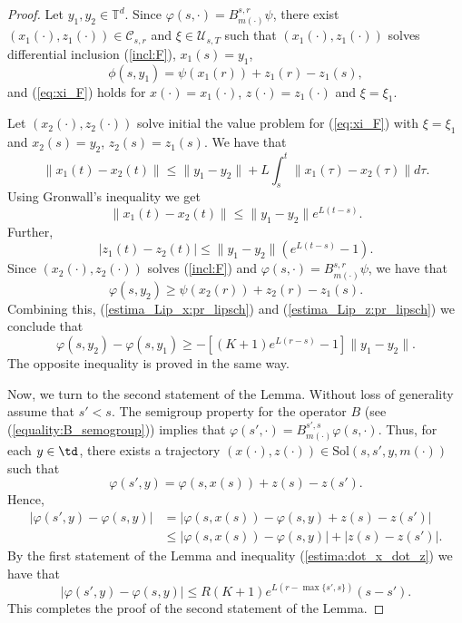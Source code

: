 \documentclass[a4paper,12pt]{article}
\begin{document}
\begin{proof}
	Let $y_1,y_2\in\mathbb{T}^d$. Since $\varphi(s,\cdot)=B^{s,r}_{m(\cdot)}\psi$, there exist $(x_1(\cdot),z_1(\cdot))\in\mathcal{C}_{s,r}$ and $\xi\in\mathcal{U}_{s,T}$ such that $(x_1(\cdot),z_1(\cdot))$ solves differential inclusion (\ref{incl:F}),   $x_1(s)=y_1$,
	$$\phi(s,y_1)=\psi(x_1(r))+z_1(r)-z_1(s), $$ and (\ref{eq:xi_F}) holds  for $x(\cdot)=x_1(\cdot)$, $z(\cdot)=z_1(\cdot)$ and $\xi=\xi_1$.
	
	Let $(x_2(\cdot),z_2(\cdot))$ solve initial the value problem for (\ref{eq:xi_F}) with $\xi=\xi_1$ and $x_2(s)=y_2$, $z_2(s)=z_1(s)$. We have that
	$$\|x_1(t)-x_2(t)\|\leq \|y_1-y_2\|+ L\int_s^t\|x_1(\tau)-x_2(\tau)\|d\tau. $$ Using Gronwall's inequality we get
	\begin{equation}\label{estima_Lip_x:pr_lipsch}
	\|x_1(t)-x_2(t)\|\leq \|y_1-y_2\|e^{L(t-s)}.
	\end{equation}
	Further,
	\begin{equation}\label{estima_Lip_z:pr_lipsch}|z_1(t)-z_2(t)|\leq \|y_1-y_2\|(e^{L(t-s)}-1).\end{equation}
	Since $(x_2(\cdot),z_2(\cdot))$  solves (\ref{incl:F}) and $\varphi(s,\cdot)=B^{s,r}_{m(\cdot)}\psi$, we have that
	$$\varphi(s,y_2)\geq \psi(x_2(r))+z_2(r)-z_1(s). $$ Combining this, (\ref{estima_Lip_x:pr_lipsch}) and (\ref{estima_Lip_z:pr_lipsch}) we conclude that
	$$\varphi(s,y_2)-\varphi(s,y_1)\geq -[(K +1)e^{L(r-s)}-1]\|y_1-y_2\|. $$ The opposite inequality is proved in the same way.
	
	
	Now, we turn to the second statement of the Lemma. Without loss of generality assume that $s'<s$. The semigroup property for the operator $B$ (see (\ref{equality:B_semogroup})) implies that $\varphi(s',\cdot)=B^{s',s}_{m(\cdot)}\varphi(s,\cdot)$. 
	Thus, for each $y\in\td$, there exists a trajectory  $(x(\cdot),z(\cdot))\in\mathrm{Sol}(s,s',y,m(\cdot))$ such that
	$$\varphi(s',y)=\varphi(s,x(s))+z(s)-z(s'). $$ Hence,
	\begin{equation*}\begin{split}
	|\varphi(s',y)-\varphi(s,y)|&=|\varphi(s,x(s))-\varphi(s,y)+z(s)-z(s')|\\&\leq |\varphi(s,x(s))-\varphi(s,y)|+|z(s)-z(s')|. 
	\end{split}
	\end{equation*} By the first statement of the Lemma and inequality (\ref{estima:dot_x_dot_z}) we have that
	$$|\varphi(s',y)-\varphi(s,y)|\leq R(K+1)e^{L(r-\max\{s',s\})}(s-s'). $$ This completes the proof of the second statement of the Lemma.
	
\end{proof}
\end{document}

